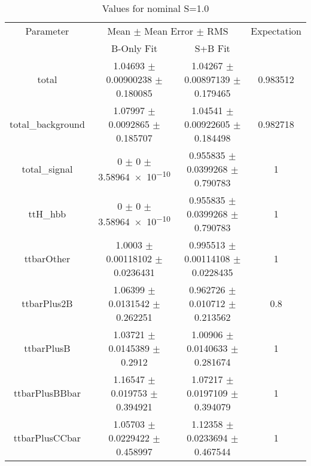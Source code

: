 \begin{table}
\centering
\caption{Values for nominal S=1.0}
\begin{tabular}{cccc}
\toprule
Parameter & \multicolumn{2}{c}{Mean $\pm$ Mean Error $\pm$ RMS} & Expectation\\
 & B-Only Fit & S+B Fit & \\
\midrule
total & \num{1.04693} $\pm$ \num{0.00900238} $\pm$ \num{0.180085} & \num{1.04267} $\pm$ \num{0.00897139} $\pm$ \num{0.179465} & \num{0.983512}\\
total\_background & \num{1.07997} $\pm$ \num{0.0092865} $\pm$ \num{0.185707} & \num{1.04541} $\pm$ \num{0.00922605} $\pm$ \num{0.184498} & \num{0.982718}\\
total\_signal & \num{0} $\pm$ \num{0} $\pm$ \num{3.58964e-10} & \num{0.955835} $\pm$ \num{0.0399268} $\pm$ \num{0.790783} & \num{1}\\
ttH\_hbb & \num{0} $\pm$ \num{0} $\pm$ \num{3.58964e-10} & \num{0.955835} $\pm$ \num{0.0399268} $\pm$ \num{0.790783} & \num{1}\\
ttbarOther & \num{1.0003} $\pm$ \num{0.00118102} $\pm$ \num{0.0236431} & \num{0.995513} $\pm$ \num{0.00114108} $\pm$ \num{0.0228435} & \num{1}\\
ttbarPlus2B & \num{1.06399} $\pm$ \num{0.0131542} $\pm$ \num{0.262251} & \num{0.962726} $\pm$ \num{0.010712} $\pm$ \num{0.213562} & \num{0.8}\\
ttbarPlusB & \num{1.03721} $\pm$ \num{0.0145389} $\pm$ \num{0.2912} & \num{1.00906} $\pm$ \num{0.0140633} $\pm$ \num{0.281674} & \num{1}\\
ttbarPlusBBbar & \num{1.16547} $\pm$ \num{0.019753} $\pm$ \num{0.394921} & \num{1.07217} $\pm$ \num{0.0197109} $\pm$ \num{0.394079} & \num{1}\\
ttbarPlusCCbar & \num{1.05703} $\pm$ \num{0.0229422} $\pm$ \num{0.458997} & \num{1.12358} $\pm$ \num{0.0233694} $\pm$ \num{0.467544} & \num{1}\\
\bottomrule
\end{tabular}
\end{table}